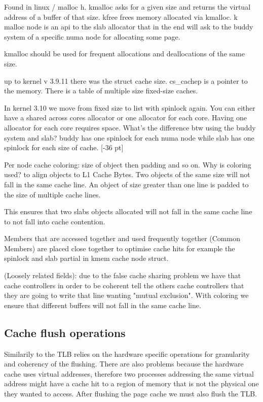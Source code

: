 \documentclass[twoside]{article}
\begin{document}
Found in linux / malloc h. kmalloc asks for a given size and returns the virtual address of a buffer of that size. kfree frees memory allocated via kmalloc. k malloc node is an api to the slab allocator that in the end will ask to the buddy system of a specific numa node for allocating some page.  

kmalloc should be used for frequent allocations and deallocations of the same size. 

up to kernel v 3.9.11 there was the struct cache size. cs\_cachep is a pointer to the memory. There is a table of multiple size fixed-size caches. 

In kernel 3.10 we move from fixed size to list with spinlock again. You can either have a shared across cores allocator or one allocator for each core. Having one allocator for each core requires space. What's the difference btw using the buddy system and slab? buddy has one spinlock for each numa node while slab has one spinlock for each size of cache. [-36 pt]

Per node cache coloring: size of object then padding and so on. Why is coloring used? to align objects to L1 Cache Bytes. Two objects of the same size will not fall in the same cache line. An object of size greater than one line is padded to the size of multiple cache lines.

This ensures that two slabs objects allocated will not fall in the same cache line to not fall into cache contention.

Members that are accessed together and used frequently together (Common Members) are placed close together to optimise cache hits for example the spinlock and slab partial in kmem cache node struct. 

(Loosely related fields): due to the false cache sharing problem we have that cache controllers in order to be coherent tell the others cache controllers that they are going to write that line wanting "mutual exclusion". With coloring we ensure that different buffers will not fall in the same cache line. 

\subsection{Cache flush operations}

Similarily to the TLB relies on the hardware specific operations for granularity and coherency of the flushing. There are also problems because the hardware cache uses virtual addresses, therefore two processes addressing the same virtual address might have a cache hit to a region of memory that is not the physical one they wanted to access. After flushing the page cache we must also flush the TLB.
\end{document}
